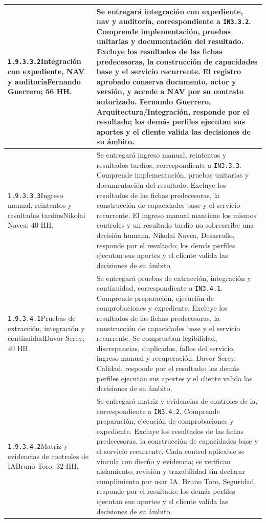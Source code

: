 \begin{longtable}{L{52mm}L{91mm}}
\texttt{1.\allowbreak{}9.\allowbreak{}3.\allowbreak{}3.\allowbreak{}2}\newline Integración con expediente, NAV y auditoría\newline Fernando Guerrero; 56 HH. & Se entregará integración con expediente, nav y auditoría, correspondiente a \texttt{IN3.3.2}. Comprende implementación, pruebas unitarias y documentación del resultado. Excluye los resultados de las fichas predecesoras, la construcción de capacidades base y el servicio recurrente.  El registro aprobado conserva documento, actor y versión, y accede a NAV por su contrato autorizado. Fernando Guerrero, Arquitectura/Integración, responde por el resultado; los demás perfiles ejecutan sus aportes y el cliente valida las decisiones de su ámbito.\\\hline
\texttt{1.\allowbreak{}9.\allowbreak{}3.\allowbreak{}3.\allowbreak{}3}\newline Ingreso manual, reintentos y resultados tardíos\newline Nikolai Navea; 40 HH. & Se entregará ingreso manual, reintentos y resultados tardíos, correspondiente a \texttt{IN3.3.3}. Comprende implementación, pruebas unitarias y documentación del resultado. Excluye los resultados de las fichas predecesoras, la construcción de capacidades base y el servicio recurrente.  El ingreso manual mantiene los mismos controles y un resultado tardío no sobrescribe una decisión humana. Nikolai Navea, Desarrollo, responde por el resultado; los demás perfiles ejecutan sus aportes y el cliente valida las decisiones de su ámbito.\\\hline
\texttt{1.\allowbreak{}9.\allowbreak{}3.\allowbreak{}4.\allowbreak{}1}\newline Pruebas de extracción, integración y continuidad\newline Davor Serey; 40 HH. & Se entregará pruebas de extracción, integración y continuidad, correspondiente a \texttt{IN3.4.1}. Comprende preparación, ejecución de comprobaciones y expediente. Excluye los resultados de las fichas predecesoras, la construcción de capacidades base y el servicio recurrente.  Se comprueban legibilidad, discrepancias, duplicados, fallos del servicio, ingreso manual y recuperación. Davor Serey, Calidad, responde por el resultado; los demás perfiles ejecutan sus aportes y el cliente valida las decisiones de su ámbito.\\\hline
\texttt{1.\allowbreak{}9.\allowbreak{}3.\allowbreak{}4.\allowbreak{}2}\newline Matriz y evidencias de controles de IA\newline Bruno Toro; 32 HH. & Se entregará matriz y evidencias de controles de ia, correspondiente a \texttt{IN3.4.2}. Comprende preparación, ejecución de comprobaciones y expediente. Excluye los resultados de las fichas predecesoras, la construcción de capacidades base y el servicio recurrente.  Cada control aplicable se vincula con diseño y evidencia; se verifican aislamiento, revisión y trazabilidad sin declarar cumplimiento por usar IA. Bruno Toro, Seguridad, responde por el resultado; los demás perfiles ejecutan sus aportes y el cliente valida las decisiones de su ámbito.\\\hline

\end{longtable}
